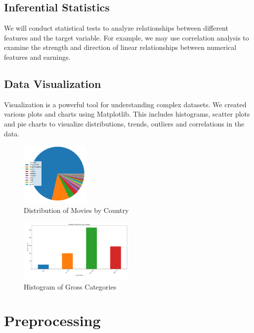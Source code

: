 \documentclass[conference]{IEEEtran}
\begin{document}
    \subsection{Inferential Statistics}
        We will conduct statistical tests to analyze relationships between different features and the target variable. For example, we may use correlation analysis to examine the strength and direction of linear relationships between numerical features and earnings.
    
    \subsection{Data Visualization}
        Visualization is a powerful tool for understanding complex datasets. We created various plots and charts using Matplotlib. This includes histograms, scatter plots and pie charts to visualize distributions, trends, outliers and correlations in the data.
        
        \begin{figure}[H]
            \centering
            \includegraphics[width=0.3\textwidth]{pie_chart.png}
            \caption{Distribution of Movies by Country}
            \label{fig:country-pie-chart}
        \end{figure}
        
        \begin{figure}[H]
            \centering
            \includegraphics[width=0.5\textwidth]{gross-histogram.png}
            \caption{Histogram of Gross Categories}
            \label{fig:gross-histogram}
        \end{figure}

\section{Preprocessing}
\end{document}

